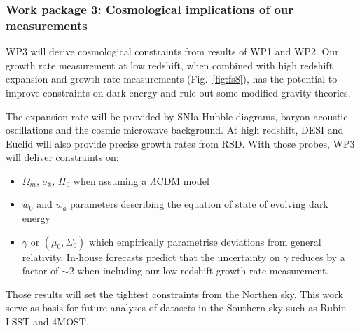 




\subsubsection*{Work package 3: Cosmological implications of our measurements} 

WP3 will derive cosmological constraints from results of WP1 and WP2. 
Our growth rate measurement at low redshift,  
when combined with high redshift expansion and growth rate measurements (Fig.~\ref{fig:fs8}),
has the potential to improve constraints on dark energy and rule out some modified gravity theories.

The expansion rate will be provided by 
SNIa Hubble diagrams, baryon acoustic oscillations and the cosmic microwave background. 
At high redshift, DESI and Euclid will also provide precise growth rates from RSD. 
With those probes, WP3 will deliver constraints on:
\begin{itemize}
  \item $\Omega_m$, $\sigma_8$, $H_0$ when assuming a $\Lambda$CDM model 
  \item $w_0$ and $w_a$ parameters describing the equation of state of evolving dark energy 
  \item $\gamma$ or $(\mu_0, \Sigma_0)$ which empirically parametrise deviations from general relativity. 
  In-house forecasts predict that the uncertainty on $\gamma$ reduces by a factor of $\sim 2$ 
  when including our low-redshift growth rate measurement. 
\end{itemize}
Those results will set the tightest constraints from the Northen sky. 
This work serve as basis for future analyses of datasets in the Southern sky such as 
Rubin LSST and 4MOST. 




